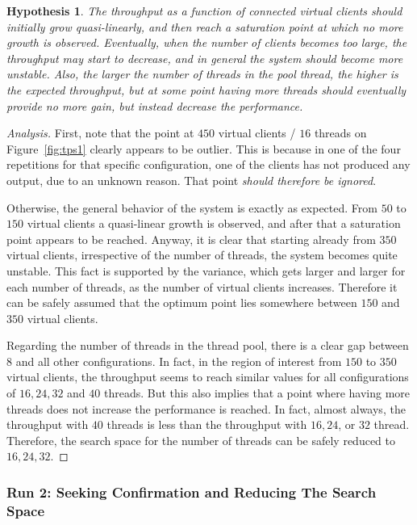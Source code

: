 \documentclass[11pt]{article}
\newtheorem{hyp}{Hypothesis}
\theoremstyle{definition}
\newenvironment{ana}[1][\proofname]{\begin{proof}[Analysis]}{\end{proof}}
\newcommand\gr[1]{{\color[HTML]{11aa11}#1}}
\begin{document}
\begin{hyp}
    \label{hyp:run1}
    The throughput as a function of connected virtual clients should initially grow quasi-linearly, and then reach a saturation point at which no more growth is observed.
    Eventually, when the number of clients becomes too large, the throughput may start to decrease, and in general the system should become more unstable.
    Also, the larger the number of threads in the pool thread, the higher is the expected throughput, but at some point having more threads should eventually provide no more gain, but instead decrease the performance.
\end{hyp}
\begin{ana}
    First, note that the point at $450$ virtual clients / $16$ threads on Figure~\ref{fig:tps1} clearly appears to be outlier.
    This is because in one of the four repetitions for that specific configuration, one of the clients has not produced any output, due to an unknown reason.
    That point \emph{should therefore be ignored}.
    
    Otherwise, the general behavior of the system is exactly as expected.
    From $50$ to $150$ virtual clients a quasi-linear growth is observed, and after that a saturation point appears to be reached.
    Anyway, it is clear that starting already from $350$ virtual clients, irrespective of the number of threads, the system becomes quite unstable.
    This fact is supported by the variance, which gets larger and larger for each number of threads, as the number of virtual clients increases.
    Therefore it can be safely assumed that the optimum point lies somewhere between $150$ and $350$ virtual clients.
    
    Regarding the number of threads in the thread pool, there is a clear gap between $8$ and all other configurations.
    In fact, in the region of interest from $150$ to $350$ virtual clients, the throughput seems to reach similar values for all configurations of $16,24,32$ and $40$ threads.
    But this also implies that a point where having more threads does not increase the performance is reached.
    In fact, almost always, the throughput with $40$ threads is less than the throughput with $16,24$, or $32$ thread.
    Therefore, the search space for the number of threads can be safely reduced to $16,24,32$.
\end{ana}

\subsubsection{\gr{Run 2}: Seeking Confirmation and Reducing The Search Space}
\end{document}
